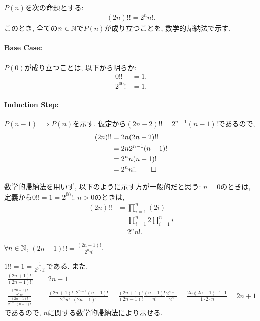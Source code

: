 \begin{proof*}
  $P(n)$を次の命題とする:
  \begin{align*}
    (2n)!!=2^nn!.
  \end{align*}
  このとき,
  全ての$n\in\mathbb{N}$で$P(n)$が成り立つことを,
  数学的帰納法で示す.

  \paragraph{Base Case:}
  $P(0)$が成り立つことは, 以下から明らか:
  \begin{align*}
    0!!&=1.\\
    2^00!&=1.
  \end{align*}

  \paragraph{Induction Step:}
  $P(n-1)\implies P(n)$を示す.
  仮定から$(2n-2)!!=2^{n-1}(n-1)!$であるので,
  \begin{align*}
    (2n)!!
    &=2n(2n-2)!!\\
    &=2n2^{n-1}(n-1)!\\
    &=2^{n}n(n-1)!\\
    &=2^nn!
    .\qedhere
  \end{align*}
\end{proof*}

\begin{rem}
  数学的帰納法を用いず, 以下のように示す方が一般的だと思う:
  $n=0$のときは, 定義から$0!!=1=2^00!$.
  $n>0$のときは,
  \begin{align*}
    (2n)!!
    &=\prod_{i=1}^{n}(2i)\\
    &=\prod_{i=1}^{n}2\prod_{i=1}^{n}i\\
    &=2^nn!.
  \end{align*}
\end{rem}


\begin{prop}
  \label{p:20230724}
  $\forall n\in\mathbb{N}$,
  $(2n+1)!!=\frac{(2n+1)!}{2^nn!}$.
\end{prop}
\begin{proof**}
  $1!!=1=\frac{1}{2^0\cdot 1!}$である.
  また,
  \begin{align*}
    \frac{(2n+1)!!}{(2n-1)!!}&=2n+1\\
    \frac{\frac{(2n+1)!}{2^nn!}}{\frac{(2n-1)!}{2^{n-1}(n-1)!}}
    &=
    \frac{(2n+1)!\cdot 2^{n-1}(n-1)!}{2^nn! \cdot (2n-1)!}
    =\frac{(2n+1)!}{(2n-1)!}\frac{(n-1)!}{n!}\frac{2^{n-1}}{2^n}
    =\frac{2n(2n+1)\cdot 1\cdot 1}{1 \cdot 2 \cdot n}=2n+1
  \end{align*}
  であるので,
  $n$に関する数学的帰納法により示せる.
\end{proof**}

